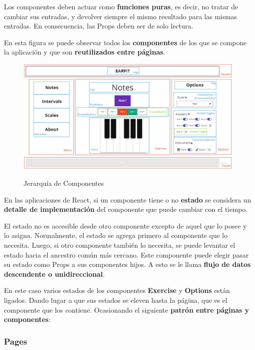 \documentclass[12pt,twoside,titlepage]{report}
\begin{document}
Los componentes deben actuar como \textbf{funciones puras}, es decir, no tratar de cambiar sus entradas, y devolver siempre el mismo resultado para las mismas entradas. En consecuencia, las Props deben ser de solo lectura. 

En esta figura se puede observar todos los \textbf{componentes} de los que se compone la aplicación y que son \textbf{reutilizados entre páginas}.

\begin{figure}[H]
    \centering
    \includegraphics[scale=0.28]{Detalles de Implementación/JerarquíaComponentes}
    \label{fig:JerarquíaComponentes}
    \caption{Jerarquía de Componentes}
\end{figure}

En las aplicaciones de React, si un componente tiene o no \textbf{estado} se considera un \textbf{detalle de implementación} del componente que puede cambiar con el tiempo.

El estado no es accesible desde otro componente excepto de aquel que lo posee y lo asigna. Normalmente, el estado se agrega primero al componente que lo necesita. Luego, si otro componente también lo necesita, se puede levantar el estado hacia el ancestro común más cercano. Este componente puede elegir pasar su estado como Props a sus componentes hijos. A esto se le llama \textbf{flujo de datos descendente o unidireccional}. 

En este caso varios estados de los componentes \textbf{Exercise} y \textbf{Options} están ligados. Dando lugar a que sus estados se eleven hasta la página, que es el componente que los contiene. Ocasionando el siguiente \textbf{patrón entre páginas y componentes}:

\subsubsection{Pages}
\end{document}
